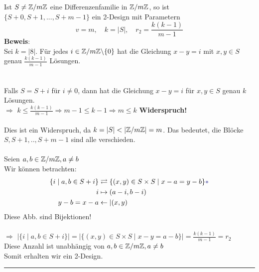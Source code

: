 \documentclass[9pt]{article}
\begin{document}
\begin{satz}
Ist $S\neq \mathbb{Z} / m \mathbb{Z}$ eine Differenzenfamilie in $\mathbb{Z} / m \mathbb{Z}$, so ist $\{S+0, S+1, ..., S+m-1\}$ ein 2-Design mit Parametern 
\[ v  = m , \quad k = |S|, \quad r_2 = \frac{k(k-1)}{m-1}\]
\textbf{Beweis}: \\
Sei $k = |8|$. Für jedes $i \in \mathbb{Z} / m \mathbb{Z} \backslash \{0\}$ hat die Gleichung $x-y=i$ mit $x,y \in S$ genau $\frac{k(k-1)}{m-1}$ Lösungen. \\
 \\
 \\
Falls $S = S+i$ für $i \neq 0$, dann hat die Gleichung $x-y=i$ für $x,y \in S$ genau $k$ Lösungen. 
 \\
$\Rightarrow$ $k \leq \frac{k(k-1)}{m-1} \Rightarrow m-1 \leq k-1 \Rightarrow m \leq k$ \textbf{Widerspruch!}\\
 \\
Dies ist ein Widerspruch, da $k = |S| < |\mathbb{Z} / m \mathbb{Z}| = m$. Das bedeutet, die Blöcke $S, S+1, .., S+m-1$ sind alle verschieden. \\
  \\ \newline
Seien $a,b \in \mathbb{Z} / m \mathbb{Z}, a\neq b$ \\
Wir können betrachten:
\begin{align*}
    \{i \mid a,b \in S+i\} & \rightleftarrows \{(x,y)\in S \times S \mid x-a = y-b \} \txc{*} \\
    i & \mapsto  (a-i, b-i) \\
    y-b = x-a & \leftarrow | (x,y) 
\end{align*}
Diese Abb. sind Bijektionen!   \\
 \\
$\Rightarrow$ $|\{ i \mid a,b \in S+i\}| = |\{(x,y) \in S \times S \mid x-y = a-b\}| = \frac{k(k-1)}{m-1} = r_2$ \\
Diese Anzahl ist unabhängig von $a,b \in \mathbb{Z} / m \mathbb{Z}, a\neq b$  \\
 Somit erhalten wir ein 2-Design. \\
 \end{satz} \noindent \rule{8cm}{0.4pt}
\end{document}
